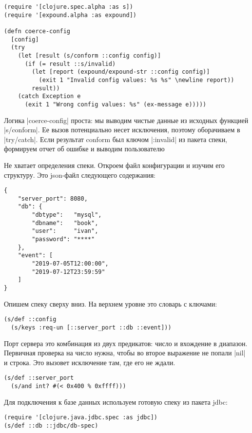 \begin{verbatim}
(require '[clojure.spec.alpha :as s])
(require '[expound.alpha :as expound])

(defn coerce-config
  [config]
  (try
    (let [result (s/conform ::config config)]
      (if (= result ::s/invalid)
        (let [report (expound/expound-str ::config config)]
          (exit 1 "Invalid config values: %s %s" \newline report))
        result))
    (catch Exception e
      (exit 1 "Wrong config values: %s" (ex-message e)))))
\end{verbatim}

Логика \spverb|coerce-config| проста: мы выводим чистые данные из исходных функцией
\spverb|s/conform|. Ее вызов потенциально несет исключения, поэтому оборачиваем в
\spverb|try/catch|. Если результат conform был ключом \spverb|:invalid| из пакета спеки,
формируем отчет об ошибке и выводим пользователю

Не хватает определения спеки. Откроем файл конфигурации и изучим его
структуру. Это json-файл следующего содержания:

\begin{verbatim}
{
    "server_port": 8080,
    "db": {
        "dbtype":   "mysql",
        "dbname":   "book",
        "user":     "ivan",
        "password": "****"
    },
    "event": [
        "2019-07-05T12:00:00",
        "2019-07-12T23:59:59"
    ]
}
\end{verbatim}

Опишем спеку сверху вниз. На верхнем уровне это словарь с ключами:

\begin{verbatim}
(s/def ::config
  (s/keys :req-un [::server_port ::db ::event]))
\end{verbatim}

Порт сервера это комбинация из двух предикатов: число и вхождение в
диапазон. Первичная проверка на число нужна, чтобы во второе выражение не попали
\spverb|nil| и строка. Это вызовет исключение там, где его не ждали.

\begin{verbatim}
(s/def ::server_port
  (s/and int? #(< 0x400 % 0xffff)))
\end{verbatim}

Для подключения к базе данных используем готовую спеку из пакета jdbc:

\begin{verbatim}
(require '[clojure.java.jdbc.spec :as jdbc])
(s/def ::db ::jdbc/db-spec)
\end{verbatim}

